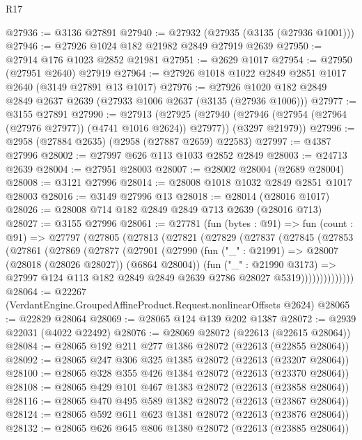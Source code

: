 \begin{lexlean}{R17}
\begin{coremodule}
@27936 := @3136 @27891
@27940 := @27932 (@27935 (@3135 (@27936 @1001)))
@27946 := @27926 @1024 @182 @21982 @2849 @27919 @2639
@27950 := @27914 @176 @1023 @2852 @21981
@27951 := @2629 @1017
@27954 := @27950 (@27951 @2640) @27919
@27964 := @27926 @1018 @1022 @2849 @2851 @1017 @2640 (@3149 @27891 @13 @1017)
@27976 := @27926 @1020 @182 @2849 @2849 @2637 @2639 (@27933 @1006 @2637 (@3135 (@27936 @1006)))
@27977 := @3155 @27891
@27990 := @27913
    (@27925
      (@27940 (@27946 (@27954 (@27964 (@27976 @27977)) (@4741 @1016 @2624)) @27977))
      (@3297 @21979))
@27996 := @2958 (@27884 @2635) (@2958 (@27887 @2659) @22583)
@27997 := @4387 @27996
@28002 := @27997 @626 @113 @1033 @2852 @2849
@28003 := @24713 @2639
@28004 := @27951 @28003
@28007 := @28002 @28004 (@2689 @28004)
@28008 := @3121 @27996
@28014 := @28008 @1018 @1032 @2849 @2851 @1017 @28003
@28016 := @3149 @27996 @13
@28018 := @28014 (@28016 @1017)
@28026 := @28008 @714 @182 @2849 @2849 @713 @2639 (@28016 @713)
@28027 := @3155 @27996
@28061 := @27781
    (fun (bytes : @91) =>
    fun (count : @91) =>
    @27797
      (@27805
        (@27813
          (@27821
            (@27829
              (@27837
                (@27845
                  (@27853
                    (@27861
                      (@27869
                        (@27877
                          (@27901
                            (@27990
                              (fun ("_" : @21991) => @28007 (@28018 (@28026 @28027)) (@6864 @28004))
                              (fun ("_" : @21990 @3173) =>
                              @27997
                                @124
                                @113
                                @182
                                @2849
                                @2849
                                @2639
                                @2786
                                @28027
                                @5319))))))))))))))
@28064 := @22267 (VerdantEngine.GroupedAffineProduct.Request.nonlinearOffsets @2624)
@28065 := @22829 @28064
@28069 := @28065 @124 @139 @202 @1387
@28072 := @2939 @22031 (@4022 @22492)
@28076 := @28069 @28072 (@22613 (@22615 @28064))
@28084 := @28065 @192 @211 @277 @1386 @28072 (@22613 (@22855 @28064))
@28092 := @28065 @247 @306 @325 @1385 @28072 (@22613 (@23207 @28064))
@28100 := @28065 @328 @355 @426 @1384 @28072 (@22613 (@23370 @28064))
@28108 := @28065 @429 @101 @467 @1383 @28072 (@22613 (@23858 @28064))
@28116 := @28065 @470 @495 @589 @1382 @28072 (@22613 (@23867 @28064))
@28124 := @28065 @592 @611 @623 @1381 @28072 (@22613 (@23876 @28064))
@28132 := @28065 @626 @645 @806 @1380 @28072 (@22613 (@23885 @28064))

\end{coremodule}
\end{lexlean}
